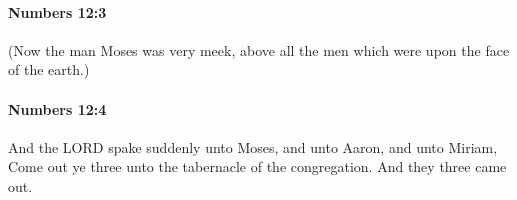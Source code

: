 		\paragraph{Numbers 12:3} %
			\label{NUMBERS-12-3}

			(Now the man Moses was very meek, above all the men which were upon the face of the earth.)


		\paragraph{Numbers 12:4} %
			\label{NUMBERS-12-4}

			And the LORD spake suddenly unto Moses, and unto Aaron, and unto Miriam, Come out ye three unto the tabernacle of the congregation. And they three came out.


